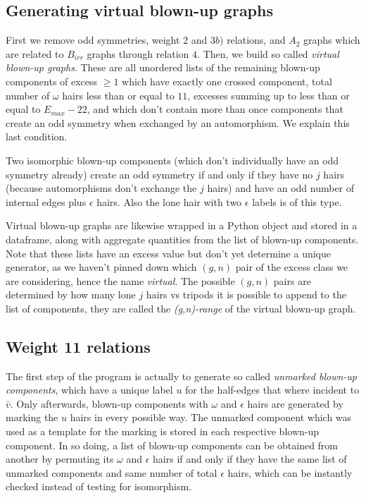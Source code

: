 \subsection{Generating virtual blown-up graphs}  First we remove odd symmetries, weight 2 and $3b)$ relations, and $A_2$ graphs which are related to $B_{irr}$ graphs through relation $4$. Then, we build so called \textit{virtual blown-up graphs}. These are all unordered lists of the remaining blown-up components of excess $\geq 1$ which have exactly one crossed component, total number of $\omega$ hairs less than or equal to $11$, excesses summing up to less than or equal to $E_{max}-22$, and which don't contain more than once components that create an odd symmetry when exchanged by an automorphism. We explain this last condition.

Two isomorphic blown-up components (which don't individually have an odd symmetry already) create an odd symmetry if and only if they have no $j$ hairs (because automorphisms don't exchange the $j$ hairs) and have an odd number of internal edges plus $\epsilon$ hairs. Also the lone hair with two $\epsilon$ labels is of this type.

Virtual blown-up graphs are likewise wrapped in a Python object and stored in a dataframe, along with aggregate quantities from the list of blown-up components. Note that these lists have an excess value but don't yet determine a unique generator, as we haven't pinned down which $(g,n)$ pair of the excess class we are considering, hence the name \textit{virtual}. The possible $(g,n)$ pairs are determined by how many lone $j$ hairs vs tripods it is possible to append to the list of components, they are called the \textit{(g,n)-range} of the virtual blown-up graph.



\subsection{Weight 11 relations} The first step of the program is actually to generate so called \textit{unmarked blown-up components}, which have a unique label $u$ for the half-edges that where incident to $\bar{v}$. Only afterwards, blown-up components with $\omega$ and $\epsilon$ hairs are generated by marking the $u$ hairs in every possible way. The unmarked component which was used as a template for the marking is stored in each respective blown-up component. In so doing, a list of blown-up components can be obtained from another by permuting its $\omega$ and $\epsilon$ hairs if and only if they have the same list of unmarked components and same number of total $\epsilon$ hairs, which can be instantly checked instead of testing for isomorphism.

